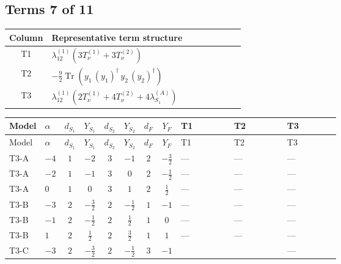 \documentclass[8pt]{article}
\begin{document}
\begin{landscape}
\subsection*{Terms 7 of 11}
\begin{center}
\begin{tabular}{@{}c >{\raggedright\arraybackslash}p{0.82\linewidth}@{}}
\toprule
Column & Representative term structure \\
\midrule
T1 & \(\displaystyle {\lambda_{12}^{(1)}} (3 T_{\nu}^{(1)}+3 T_{\nu}^{(2)})\) \\
\midrule
T2 & \(\displaystyle -\frac{9}{2} \operatorname{Tr}\!\left({y_1}\,\left({y_1}\right)^{\dagger}\,{y_2}\,\left({y_2}\right)^{\dagger}\right)\) \\
\midrule
T3 & \(\displaystyle {\lambda_{12}^{(1)}} (2 T_{\nu}^{(1)}+4 T_{\nu}^{(2)}+4 {\lambda_{S_1}^{(A)}})\) \\
\midrule
\bottomrule
\end{tabular}
\end{center}
\smallskip
\tiny
\begin{longtable}{@{}llcccccc >{\raggedright\arraybackslash}p{0.21\linewidth} >{\raggedright\arraybackslash}p{0.21\linewidth} >{\raggedright\arraybackslash}p{0.21\linewidth}@{}}
\toprule
Model & $\alpha$ & $d_{S_1}$ & $Y_{S_1}$ & $d_{S_2}$ & $Y_{S_2}$ & $d_F$ & $Y_F$ & T1 & T2 & T3 \\
\midrule
\endfirsthead
\toprule
Model & $\alpha$ & $d_{S_1}$ & $Y_{S_1}$ & $d_{S_2}$ & $Y_{S_2}$ & $d_F$ & $Y_F$ & T1 & T2 & T3 \\
\midrule
\endhead
T3-A & $-4$ & $1$ & $-2$ & $3$ & $-1$ & $2$ & $-\frac{3}{2}$ & --- & --- & --- \\
\midrule
T3-A & $-2$ & $1$ & $-1$ & $3$ & $0$ & $2$ & $-\frac{1}{2}$ & --- & --- & --- \\
\midrule
T3-A & $0$ & $1$ & $0$ & $3$ & $1$ & $2$ & $\frac{1}{2}$ & --- & --- & --- \\
\midrule
T3-B & $-3$ & $2$ & $-\frac{3}{2}$ & $2$ & $-\frac{1}{2}$ & $1$ & $-1$ & --- & --- & --- \\
\midrule
T3-B & $-1$ & $2$ & $-\frac{1}{2}$ & $2$ & $\frac{1}{2}$ & $1$ & $0$ & --- & --- & --- \\
\midrule
T3-B & $1$ & $2$ & $\frac{1}{2}$ & $2$ & $\frac{3}{2}$ & $1$ & $1$ & --- & --- & --- \\
\midrule
T3-C & $-3$ & $2$ & $-\frac{3}{2}$ & $2$ & $-\frac{1}{2}$ & $3$ & $-1$ & \scriptsize\adjustbox{max width=\linewidth}{$\begin{gathered} {\lambda_{12}^{(1)}} (3 T_{\nu}^{(1)}+3 T_{\nu}^{(2)})\end{gathered}$} & \scriptsize\adjustbox{max width=\linewidth}{$\begin{gathered} -\frac{9}{2} \operatorname{Tr}\!\left({y_1}\,\left({y_1}\right)^{\dagger}\,{y_2}\,\left({y_2}\right)^{\dagger}\right)\end{gathered}$} & --- \\

\end{longtable}
\end{landscape}
\end{document}
